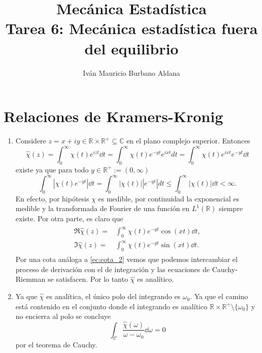 \documentclass{article}
\title{Mecánica Estadística\\
Tarea 6: Mecánica estadística fuera del equilibrio}
\author{Iván Mauricio Burbano Aldana}
\begin{document}
\maketitle

\section{Relaciones de Kramers-Kronig}

\begin{enumerate}

\item Considere $z=x+iy\in\mathbb{R}\times\mathbb{R}^+\subseteq\mathbb{C}$ en el plano complejo superior. Entonces
\begin{equation}
\hat{\chi}(z)=\int_0^\infty\chi(t)e^{izt}\dd{t}=\int_0^\infty\chi(t)e^{-yt}e^{ixt}dt=\int_0^\infty\chi(t)e^{ixt}e^{-yt}\dd{t}
\end{equation} 
existe ya que para todo $y\in\mathbb{R}^+:=(0,\infty)$
\begin{equation}\label{ec:cota_2}
\int_0 ^\infty |\chi(t)e^{-yt}| \dd{t}=\int_0 ^\infty |\chi(t)||e^{-yt}| dt\leq\int_0 ^\infty |\chi(t)| \dd{t}<\infty.
\end{equation}
En efecto, por hipótesis $\chi$ es medible, por continuidad la exponencial es medible y la transformada de Fourier de una función en $L^1(\mathbb{R})$ siempre existe\cite{Rudin1987}. Por otra parte, es claro que
\begin{align}
\begin{split}
\Re\hat{\chi}(z)=&\int_0^\infty\chi(t)e^{-yt}\cos(xt)\dd{t},\\
\Im\hat{\chi}(z)=&\int_0^\infty\chi(t)e^{-yt}\sin(xt)\dd{t}.
\end{split}
\end{align}
Por una cota análoga a \eqref{ec:cota_2} vemos que podemos intercambiar el proceso de derivación con el de integración y las ecuaciones de Cauchy-Riemman se satisfacen\cite{Rudin1987}. Por lo tanto $\hat{\chi}$ es analítico.

\item Ya que $\hat{\chi}$ es analítica, el único polo del integrando es $\omega_0$. Ya que el camino está contenido en el conjunto donde el integrando es analítico $\mathbb{R}\times\mathbb{R}^+\setminus\{\omega_0\}$ y no encierra al polo se concluye
\begin{equation}
\int_\mathcal{C}\frac{\hat{\chi}(\omega)}{\omega-\omega_0}\dd{\omega}=0
\end{equation}
por el teorema de Cauchy.


\end{enumerate}
\end{document}
